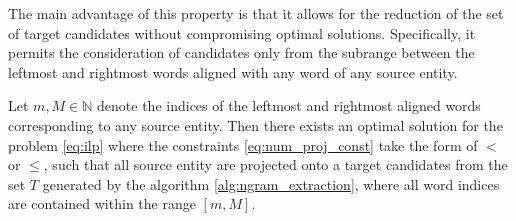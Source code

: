 The main advantage of this property is that it allows for the reduction of the set of
target candidates without compromising optimal solutions. Specifically, it permits
the consideration of candidates only from the subrange between the leftmost and
rightmost words aligned with any word of any source entity.
\begin{theorem} \label{thm:reduce_T_for_align}
  Let \( m, M \in \mathbb{N} \) denote the indices of the leftmost and rightmost
  aligned words corresponding to any source entity. Then there exists
  an optimal solution for the problem \eqref{eq:ilp} where the constraints
  \eqref{eq:num_proj_const} take the form of \( < \) or \( \leq \), such that
  all source entity are projected onto a target candidates from the set \( T \)
  generated by the algorithm \ref{alg:ngram_extraction}, where all word indices
  are contained within the range \( [m, M] \).
\end{theorem}
